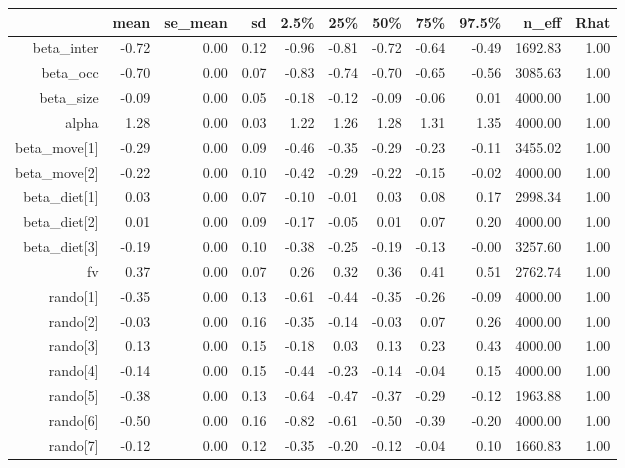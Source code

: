 \begin{table}[ht]
\centering
\begin{tabular}{rrrrrrrrrrr}
  \hline
 & mean & se\_mean & sd & 2.5\% & 25\% & 50\% & 75\% & 97.5\% & n\_eff & Rhat \\ 
  \hline
beta\_inter & -0.72 & 0.00 & 0.12 & -0.96 & -0.81 & -0.72 & -0.64 & -0.49 & 1692.83 & 1.00 \\ 
  beta\_occ & -0.70 & 0.00 & 0.07 & -0.83 & -0.74 & -0.70 & -0.65 & -0.56 & 3085.63 & 1.00 \\ 
  beta\_size & -0.09 & 0.00 & 0.05 & -0.18 & -0.12 & -0.09 & -0.06 & 0.01 & 4000.00 & 1.00 \\ 
  alpha & 1.28 & 0.00 & 0.03 & 1.22 & 1.26 & 1.28 & 1.31 & 1.35 & 4000.00 & 1.00 \\ 
  beta\_move[1] & -0.29 & 0.00 & 0.09 & -0.46 & -0.35 & -0.29 & -0.23 & -0.11 & 3455.02 & 1.00 \\ 
  beta\_move[2] & -0.22 & 0.00 & 0.10 & -0.42 & -0.29 & -0.22 & -0.15 & -0.02 & 4000.00 & 1.00 \\ 
  beta\_diet[1] & 0.03 & 0.00 & 0.07 & -0.10 & -0.01 & 0.03 & 0.08 & 0.17 & 2998.34 & 1.00 \\ 
  beta\_diet[2] & 0.01 & 0.00 & 0.09 & -0.17 & -0.05 & 0.01 & 0.07 & 0.20 & 4000.00 & 1.00 \\ 
  beta\_diet[3] & -0.19 & 0.00 & 0.10 & -0.38 & -0.25 & -0.19 & -0.13 & -0.00 & 3257.60 & 1.00 \\ 
  fv & 0.37 & 0.00 & 0.07 & 0.26 & 0.32 & 0.36 & 0.41 & 0.51 & 2762.74 & 1.00 \\ 
  rando[1] & -0.35 & 0.00 & 0.13 & -0.61 & -0.44 & -0.35 & -0.26 & -0.09 & 4000.00 & 1.00 \\ 
  rando[2] & -0.03 & 0.00 & 0.16 & -0.35 & -0.14 & -0.03 & 0.07 & 0.26 & 4000.00 & 1.00 \\ 
  rando[3] & 0.13 & 0.00 & 0.15 & -0.18 & 0.03 & 0.13 & 0.23 & 0.43 & 4000.00 & 1.00 \\ 
  rando[4] & -0.14 & 0.00 & 0.15 & -0.44 & -0.23 & -0.14 & -0.04 & 0.15 & 4000.00 & 1.00 \\ 
  rando[5] & -0.38 & 0.00 & 0.13 & -0.64 & -0.47 & -0.37 & -0.29 & -0.12 & 1963.88 & 1.00 \\ 
  rando[6] & -0.50 & 0.00 & 0.16 & -0.82 & -0.61 & -0.50 & -0.39 & -0.20 & 4000.00 & 1.00 \\ 
  rando[7] & -0.12 & 0.00 & 0.12 & -0.35 & -0.20 & -0.12 & -0.04 & 0.10 & 1660.83 & 1.00 \\ 

\end{tabular}
\end{table}
